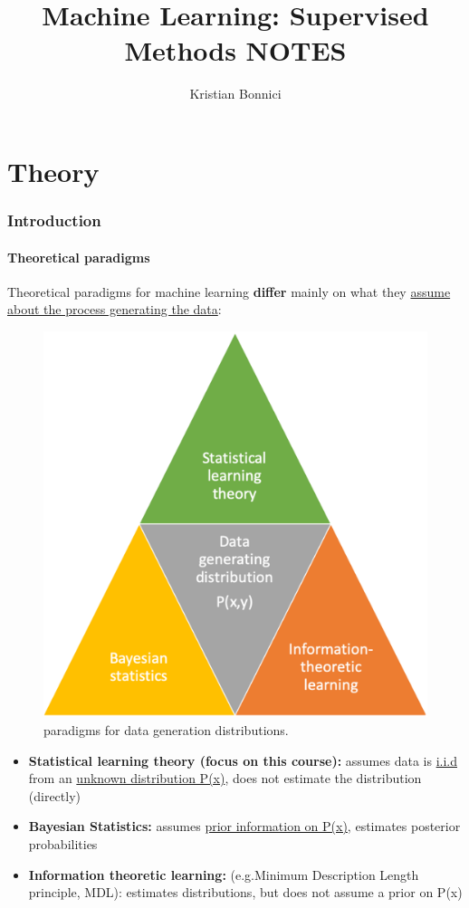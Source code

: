 \documentclass[12pt]{article}
\title{Machine Learning: Supervised Methods
NOTES}
\author{Kristian Bonnici}
\begin{document}
\maketitle
\tableofcontents

\part{Theory}

\section{Introduction}

\subsection{Theoretical paradigms }\label{theoretical-paradigms}

Theoretical paradigms for machine learning \textbf{differ} mainly on
what they \underline{assume about the process generating the data}:

\begin{figure}[H]
  \centering  %
    \includegraphics[width=0.5\columnwidth]{images/theoretical-paradigms.png}
    \caption{paradigms for data generation distributions.}
    \label{fig:fig1}
\end{figure}

\begin{itemize}
\item
  \textbf{\textcolor[HTML]{7EAA55}{Statistical learning theory (focus on this course)}:} assumes
  data is \underline{i.i.d} from an \underline{unknown distribution P(x)}, does not estimate the
  distribution (directly)
\item
  \textbf{\textcolor[HTML]{F5C342}{Bayesian Statistics}:} assumes \underline{prior information on P(x)}, estimates posterior probabilities
\item
  \textbf{\textcolor[HTML]{DE8344}{Information theoretic learning}:} (e.g.Minimum Description Length principle, MDL):
  estimates distributions, but does not assume a prior on P(x)

\end{itemize}
\end{document}
